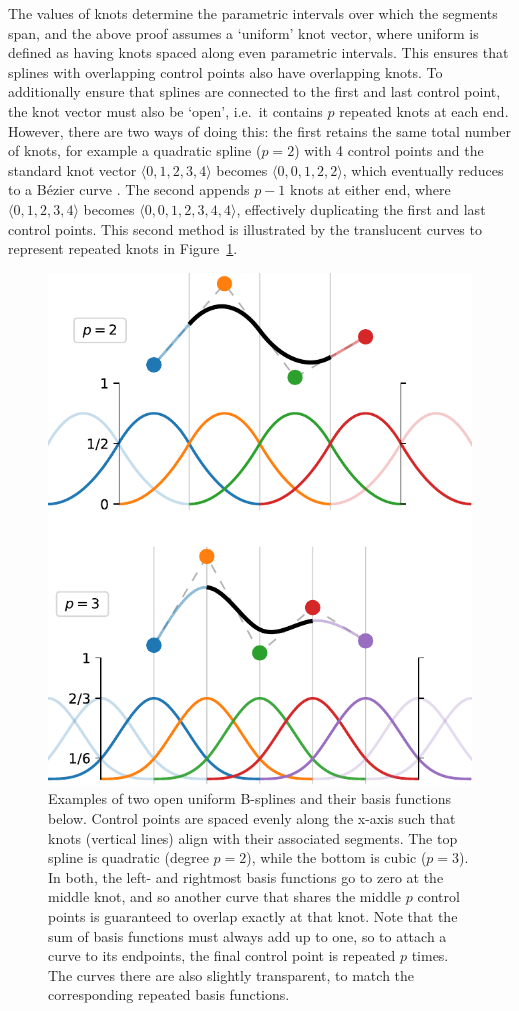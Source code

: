 The values of knots determine the parametric intervals over which the segments span, and the above proof assumes a `uniform' knot vector, where uniform is defined as having knots spaced along even parametric intervals. This ensures that splines with overlapping control points also have overlapping knots.
To additionally ensure that splines are connected to the first and last control point, the knot vector must also be `open', i.e.\ it contains $p$ repeated knots at each end.
However, there are two ways of doing this: the first retains the same total number of knots, for example a quadratic spline ($p=2$) with 4 control points and the standard knot vector $\langle0,1,2,3,4\rangle$ becomes $\langle0,0,1,2,2\rangle$, which eventually reduces to a B\'ezier curve \cite{Sederberg2005}. The second appends $p-1$ knots at either end, where $\langle0,1,2,3,4\rangle$ becomes $\langle0,0,1,2,3,4,4\rangle$, effectively duplicating the first and last control points.
This second method is illustrated by the translucent curves to represent repeated knots in Figure~\ref{fig:basis}.

\begin{figure}
  \centering
  \includegraphics[width=.85\linewidth]{power/basis.pdf}
  \caption[B-spline basis functions]{Examples of two open uniform B-splines and their basis functions below. Control points are spaced evenly along the x-axis such that knots (vertical lines) align with their associated segments. The top spline is quadratic (degree $p=2$), while the bottom is cubic ($p=3$). In both, the left- and rightmost basis functions go to zero at the middle knot, and so another curve that shares the middle $p$ control points is guaranteed to overlap exactly at that knot. Note that the sum of basis functions must always add up to one, so to attach a curve to its endpoints, the final control point is repeated $p$ times. The curves there are also slightly transparent, to match the corresponding repeated basis functions.}
  \label{fig:basis}
\end{figure}

